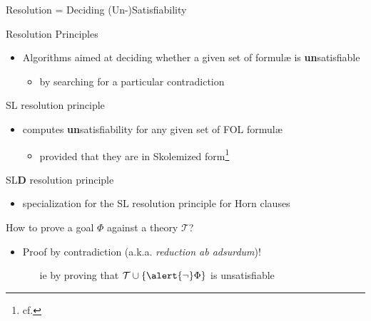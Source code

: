 \documentclass[presentation]{beamer}\mode<presentation>{\usetheme{AMSBolognaFC}}
\begin{document}
\begin{frame}[allowframebreaks]{Resolution = Deciding (Un-)Satisfiability}

    \begin{block}{Resolution Principles}
        \begin{itemize}
            \item Algorithms aimed at \alert{deciding} whether a given set of formul\ae{} is \textbf{un}satisfiable
            \begin{itemize}
                \item by searching for a particular \alert{contradiction}
            \end{itemize}
        \end{itemize}
    \end{block}

    \begin{exampleblock}{SL resolution principle \cite{Robinson1965}}
        \begin{itemize}
            \item computes \textbf{un}satisfiability for any given set of FOL formul\ae{}
            \begin{itemize}
                \item provided that they are in Skolemized form\footnote{cf. }
            \end{itemize}
        \end{itemize}
    \end{exampleblock}

    \begin{exampleblock}{SL\textbf{D} resolution principle \cite{KowVan1970}}
        \begin{itemize}
            \item specialization for the SL resolution principle for Horn clauses
        \end{itemize}
    \end{exampleblock}

    \begin{alertblock}{How to prove a goal $\Phi$ against a theory $\mathcal{T}$?}
        \begin{itemize}
            \item Proof \alert{by contradiction} (a.k.a. \emph{reduction ab adsurdum})!
            \begin{itemize}
                \item[ie] by proving that $\mathcal{T} \cup \{ \alert{\neg} \Phi \}$ is \alert{unsatisfiable}
            \end{itemize}
        \end{itemize}
    \end{alertblock}


\end{frame}
\end{document}

